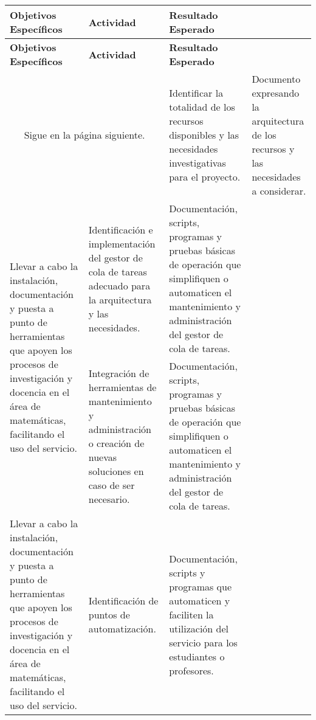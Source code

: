 \begin{doublespace}
  \begin{longtable}{m{4.6cm}m{4.6cm}m{4.6cm}}
    \hline
    \textbf{Objetivos Específicos} & \textbf{Actividad} &\textbf{Resultado Esperado} \\
    \hline 
    \endfirsthead
    \hline
    \textbf{Objetivos Específicos} & \textbf{Actividad} &\textbf{Resultado Esperado } \\
    \hline 
    \endhead
    \multicolumn{2}{c}{Sigue en la página siguiente.}
    \endfoot
    \endlastfoot
    \text Identificar recursos disponibles y necesidades investigativas. &
    Identificar la totalidad de los recursos disponibles y las necesidades
    investigativas para el proyecto.                                     &
    Documento expresando la arquitectura de los
    recursos y las necesidades a considerar.
    \\
    \hline    
    \multirow{2}{4.3cm}{Llevar a cabo la instalación, documentación y puesta
      a punto de herramientas que apoyen los procesos de investigación y
      docencia en
    el área de matemáticas, facilitando el uso del servicio.}            &
    Identificación e
    implementación del gestor de cola de tareas adecuado para la arquitectura
    y las
    necesidades.                                                         &
    Documentación, scripts, programas y pruebas básicas de operación
    que simplifiquen o automaticen el mantenimiento y administración del
    gestor de
    cola de tareas.
    \\ \cline{2-3}
                                                                         &
    Integración de herramientas de mantenimiento y administración o
    creación de nuevas soluciones en caso de ser necesario.              &
    Documentación,
    scripts, programas y pruebas básicas de operación que simplifiquen o
    automaticen el mantenimiento y administración del gestor de cola de
    tareas.                                                                \\
    \hline
    \multirow{2}{4.3cm}{Llevar a cabo la instalación, documentación y puesta a punto de herramientas que apoyen los procesos de investigación y docencia en el área de matemáticas, facilitando el uso del servicio.}            &
    Identificación de puntos de automatización.                                                         &
    Documentación, scripts y programas que automaticen y faciliten la utilización del servicio para los estudiantes o profesores.

\end{longtable}
\end{doublespace}
